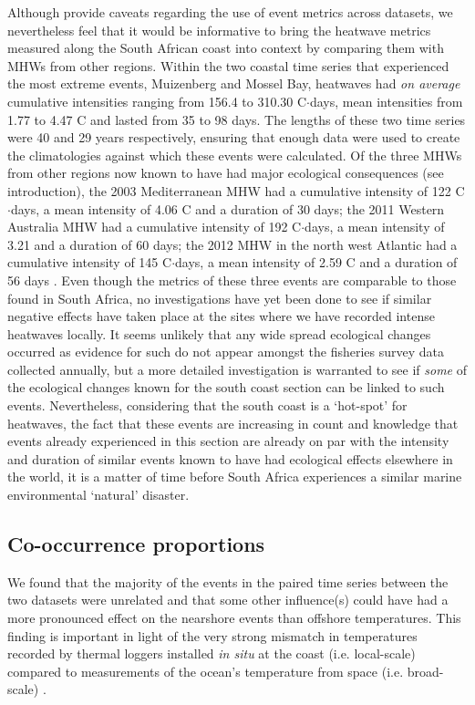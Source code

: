 \documentclass[a4paper,10pt,review]{elsarticle}
\begin{document}
Although \citet{Hobday2016} provide caveats regarding the use of event metrics across datasets, we nevertheless feel that it would be informative to bring the heatwave metrics measured along the South African coast into context by comparing them with MHWs from other regions. Within the two coastal time series that experienced the most extreme events, Muizenberg and Mossel Bay, heatwaves had \emph{on average} cumulative intensities ranging from 156.4 to 310.30 \degree C$\cdot$days, mean intensities from 1.77 to 4.47 \degree C and lasted from 35 to 98 days. The lengths of these two time series were 40 and 29 years respectively, ensuring that enough data were used to create the climatologies against which these events were calculated. Of the three MHWs from other regions now known to have had major ecological consequences (see introduction), the 2003 Mediterranean MHW had a cumulative intensity of 122 \degree C$\cdot$days, a mean intensity of 4.06 \degree C and a duration of 30 days; the 2011 Western Australia MHW had a cumulative intensity of 192 \degree C$\cdot$days, a mean intensity of 3.21 and a duration of 60 days; the 2012 MHW in the north west Atlantic had a cumulative intensity of 145 \degree C$\cdot$days, a mean intensity of 2.59 \degree C and a duration of 56 days \citep{Hobday2016}. Even though the metrics of these three events are comparable to those found in South Africa, no investigations have yet been done to see if similar negative effects have taken place at the sites where we have recorded intense heatwaves locally. It seems unlikely that any wide spread ecological changes occurred as evidence for such do not appear amongst the fisheries survey data collected annually, but a more detailed investigation is warranted to see if \emph{some} of the ecological changes known for the south coast section \citep{Bolton2012} can be linked to such events. Nevertheless, considering that the south coast is a `hot-spot' for heatwaves, the fact that these events are increasing in count and knowledge that events already experienced in this section are already on par with the intensity and duration of similar events known to have had ecological effects elsewhere in the world, it is a matter of time before South Africa experiences a similar marine environmental `natural' disaster.

\subsection{Co-occurrence proportions}
We found that the majority of the events in the paired time series between the two datasets were unrelated and that some other influence(s) could have had a more pronounced effect on the nearshore events than offshore temperatures. This finding is important in light of the very strong mismatch in temperatures recorded by thermal loggers installed \emph{in situ} at the coast (i.e. local-scale) compared to measurements of the ocean's temperature from space (i.e. broad-scale) \citep{Smit2013}.
\end{document}
